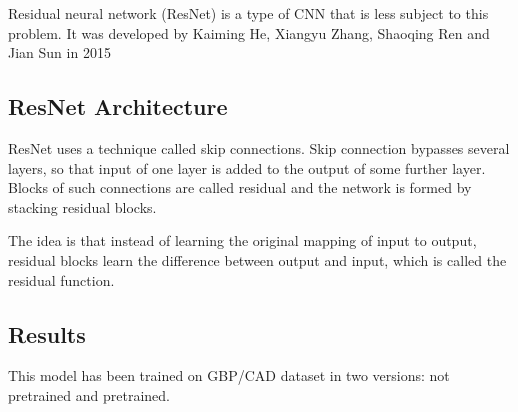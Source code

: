 Residual neural network (ResNet) is a type of CNN that is less subject to this problem.
It was developed by Kaiming He, Xiangyu Zhang, Shaoqing Ren and Jian Sun in 2015 \cite{residual_neural_network}

\subsection{ResNet Architecture}
ResNet uses a technique called skip connections. Skip connection bypasses several layers, so
that input of one layer is added to the output of some further layer. Blocks of such connections
are called residual and the network is formed by stacking residual blocks.

The idea is that instead of learning the original mapping of input to output, residual blocks
learn the difference between output and input, which is called the residual function.

\subsection{Results}

This model has been trained on GBP/CAD dataset in two versions: not pretrained and pretrained.




















